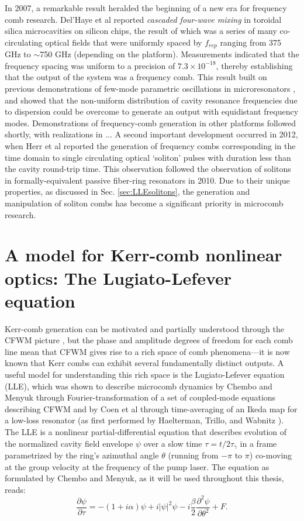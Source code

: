 In 2007, a remarkable result heralded the beginning of a new era for frequency comb research. Del'Haye et al reported \textit{cascaded four-wave mixing} in toroidal silica microcavities on silicon chips, the result of which was a series of many co-circulating optical fields that were uniformly spaced by $f_{rep}$ ranging from 375 GHz to $\sim$750 GHz (depending on the platform)\cite{DelHaye2007}. Measurements indicated that the frequency spacing was uniform to a precision of $7.3 \times 10^{-18}$, thereby establishing that the output of the system was a frequency comb. This result built on previous demonstrations of few-mode parametric oscillations in microresonators \cite{Kippenberg2004, Savchenkov2004,Agha2007}, and showed that the non-uniform distribution of cavity resonance frequencies due to dispersion could be overcome to generate an output with equidistant frequency modes. Demonstrations of frequency-comb generation in other platforms followed shortly, with realizations in ... A second important development occurred in 2012, when Herr et al reported the generation of frequency combs corresponding in the time domain to single circulating optical `soliton' pulses with duration less than the cavity round-trip time. This observation followed the observation of solitons in formally-equivalent passive fiber-ring resonators in 2010\cite{Leo2010a}. Due to their unique properties, as discussed in Sec. \ref{sec:LLEsolitons}, the generation and manipulation of soliton combs has become a significant priority in microcomb research. 

\section{A model for Kerr-comb nonlinear optics: The Lugiato-Lefever equation}

Kerr-comb generation can be motivated and partially understood through the CFWM picture \cite{Herr2012}, but the phase and amplitude degrees of freedom for each comb line mean that CFWM gives rise to a rich space of comb phenomena---it is now known that Kerr combs can exhibit several fundamentally distinct outputs.  A useful model for understanding this rich space is the Lugiato-Lefever equation (LLE), which was shown to describe microcomb dynamics by Chembo and Menyuk \cite{Chembo2013} through Fourier-transformation of a set of coupled-mode equations describing CFWM and by Coen et al \cite{Coen2013a} through time-averaging of an Ikeda map for a low-loss resonator (as first performed by Haelterman, Trillo, and Wabnitz \cite{Haelterman1992a}).  The LLE is a nonlinear partial-differential equation that describes evolution of the normalized cavity field envelope $\psi$ over a slow time $\tau=t/2\tau_\gamma$ in a frame parametrized by the ring's azimuthal angle $\theta$ (running from $-\pi$ to $\pi$) co-moving at the group velocity at the frequency of the pump laser. The equation as formulated by Chembo and Menyuk, as it will be used throughout this thesis, reads:
\begin{equation}
\frac{\partial \psi}{\partial \tau}=-(1+i \alpha) \psi + i|\psi|^2 \psi -i \frac{\beta}{2} \frac{\partial^2 \psi}{\partial \theta^2} +F. \label{eq:LLE}
\end{equation}

